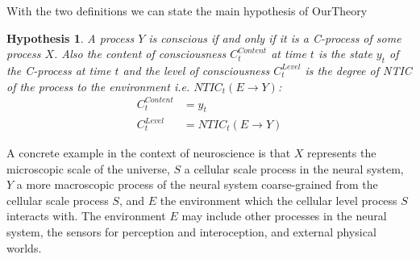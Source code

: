 \documentclass[utf8]{article}
\newtheorem*{hypothesis}{Hypothesis}
\begin{document}
         With the two definitions we can state the main hypothesis of \ac{OurTheory}
        \begin{hypothesis}
        A process $Y$ is conscious if and only if it is a C-process of some process $X$. Also the content of consciousness $C_t^{Content}$ at time $t$ is the state $y_t$ of the C-process at time $t$ and the level of consciousness $C_t^{Level}$ is the degree of NTIC of the process to the environment i.e. $NTIC_t(E\rightarrow Y)$:
        \begin{align}
            C_t^{Content} &= y_t \label{eq:cContent}\\
            C_t^{Level} &= NTIC_t(E\rightarrow Y) \label{eq:cLevel}
        \end{align}
        \end{hypothesis}

        A concrete example in the context of neuroscience is that $X$ represents the microscopic scale of the universe, $S$ a cellular scale process in the neural system, $Y$ a more macroscopic process of the neural system coarse-grained from the cellular scale process $S$, and $E$ the environment which the cellular level process $S$ interacts with.  The environment $E$ may include other processes in the neural system, the sensors for perception and interoception, and external physical worlds.
        
\end{document}
